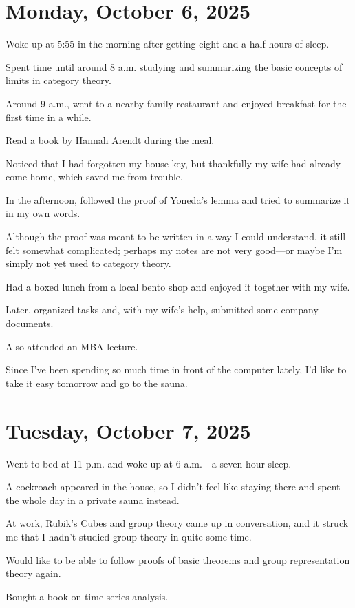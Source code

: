 \documentclass[uplatex]{jsarticle}
\begin{document}
\section{Monday, October 6, 2025}

Woke up at 5:55 in the morning after getting eight and a half hours of sleep.

Spent time until around 8 a.m. studying and summarizing the basic concepts of limits in category theory.

Around 9 a.m., went to a nearby family restaurant and enjoyed breakfast for the first time in a while.

Read a book by Hannah Arendt during the meal.

Noticed that I had forgotten my house key, but thankfully my wife had already come home, which saved me from trouble.

In the afternoon, followed the proof of Yoneda's lemma and tried to summarize it in my own words.

Although the proof was meant to be written in a way I could understand, it still felt somewhat complicated; perhaps my notes are not very good—or maybe I'm simply not yet used to category theory.

Had a boxed lunch from a local bento shop and enjoyed it together with my wife.

Later, organized tasks and, with my wife's help, submitted some company documents.

Also attended an MBA lecture.

Since I've been spending so much time in front of the computer lately, I'd like to take it easy tomorrow and go to the sauna.


\section{Tuesday, October 7, 2025}

Went to bed at 11 p.m. and woke up at 6 a.m.—a seven-hour sleep.

A cockroach appeared in the house, so I didn't feel like staying there and spent the whole day in a private sauna instead.

At work, Rubik's Cubes and group theory came up in conversation, and it struck me that I hadn't studied group theory in quite some time.

Would like to be able to follow proofs of basic theorems and group representation theory again.

Bought a book on time series analysis.
\end{document}
